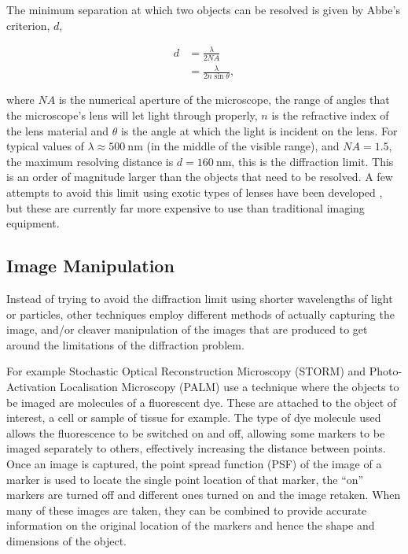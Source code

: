 The minimum separation at which two objects can be resolved is given by Abbe's
criterion, $d$,

\begin{align}
	d &= \frac{\lambda}{2N\!A} \\
	  &= \frac{\lambda}{2n\sin\theta},
\end{align}

where $N\!A$ is the numerical aperture of the microscope, the range of angles
that the microscope's lens will let light through properly, $n$ is the
refractive index of the lens material and $\theta$ is the angle at which the
light is incident on the lens. For typical values of $\lambda \approx
\SI{500}{\nano\metre}$ (in the middle of the visible range), and $N\!A = 1.5$,
the maximum resolving distance is $d = \SI{160}{\nano\meter}$, this is the
diffraction limit. This is an order of magnitude larger than the objects that
need to be resolved. A few attempts to avoid this limit using exotic types of
lenses have been developed \cite{fang2005sub}, but these are currently far more
expensive to use than traditional imaging equipment.

\subsection{Image Manipulation}
\label{sub:image_manipulation}

Instead of trying to avoid the diffraction limit using shorter wavelengths of
light or particles, other techniques employ different methods of actually
capturing the image, and/or cleaver manipulation of the images that are
produced to get around the limitations of the diffraction problem.

For example Stochastic Optical Reconstruction Microscopy (STORM)
\cite{rust2006sub} and Photo-Activation Localisation Microscopy
(PALM) \cite{owen2010palm} use a technique where the objects to be imaged are
molecules of a fluorescent dye. These are attached to the object of interest, a
cell or sample of tissue for example. The type of dye molecule used allows the
fluorescence to be switched on and off, allowing some markers to be imaged
separately to others, effectively increasing the distance between points. Once
an image is captured, the point spread function (PSF) of the image of a marker
is used to locate the single point location of that marker, the ``on'' markers
are turned off and different ones turned on and the image retaken.  When many
of these images are taken, they can be combined to provide accurate information
on the original location of the markers and hence the shape and dimensions of
the object.

